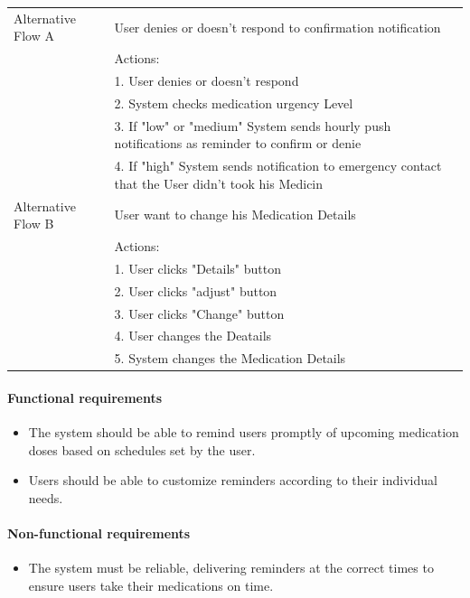 \documentclass{article}
\begin{document}
\begin{table}[h!]
\begin{tabularx}{\textwidth}{|>{\raggedright\arraybackslash}p{}|X|}
        Alternative Flow A & User denies or doesn't respond to confirmation notification \\
                         & Actions: \\
                         & 1. User denies or doesn't respond \\
                         & 2. System checks medication urgency Level \\
                         & 3. If "low" or "medium" System sends hourly push notifications as reminder 
                           to confirm or denie \\
                         & 4. If "high" System sends notification to emergency contact that the User didn't took his Medicin \\ \hline
        Alternative Flow B & User want to change his Medication Details \\
                         & Actions: \\
                         & 1. User clicks "Details" button \\
                         & 2. User clicks "adjust" button \\
                         & 3. User clicks "Change" button \\
                         & 4. User changes the Deatails \\
                         & 5. System changes the Medication Details\\ \hline
    \end{tabularx}
\end{table}

\paragraph{Functional requirements}
		\begin{itemize}
			\item  The system should be able to remind users promptly of upcoming medication doses based on schedules set by the user.
			\item  Users should be able to customize reminders according to their individual needs.
		\end{itemize}
		
	\paragraph{Non-functional requirements}
		\begin{itemize}
			\item The system must be reliable, delivering reminders at the correct times to ensure users take their medications on time.
		\end{itemize}
\end{document}
